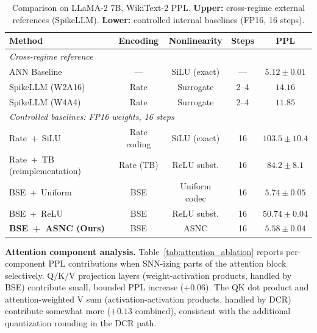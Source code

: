 \documentclass{article}
\theoremstyle{plain}
\theoremstyle{definition}
\theoremstyle{remark}
\begin{document}
\begin{table}[h!]
\centering
\caption{Comparison on LLaMA-2 7B, WikiText-2 PPL.
\textbf{Upper:} cross-regime external references (SpikeLLM).
\textbf{Lower:} controlled internal baselines (FP16, 16 steps).}
\label{tab:comparison}
\footnotesize
\setlength{\tabcolsep}{4pt}
\begin{tabular}{lcccc}
\toprule
\textbf{Method} & \textbf{Encoding} & \textbf{Nonlinearity} & \textbf{Steps} & \textbf{PPL} \\
\midrule
\multicolumn{5}{l}{\textit{Cross-regime reference}} \\
ANN Baseline              & ---          & SiLU (exact)    & ---  & $5.12 \pm 0.01$ \\
SpikeLLM (W2A16)          & Rate         & Surrogate       & 2--4 & $14.16$ \\
SpikeLLM (W4A4)           & Rate         & Surrogate       & 2--4 & $11.85$ \\
\midrule
\multicolumn{5}{l}{\textit{Controlled baselines: FP16 weights, 16 steps}} \\
Rate~+~SiLU               & Rate coding  & SiLU (exact)    & 16   & $103.5 \pm 10.4$ \\
Rate~+~TB (reimplementation)& Rate (TB)  & ReLU subst.     & 16   & $84.2 \pm 8.1$ \\
BSE~+~Uniform             & BSE          & Uniform codec   & 16   & $5.74 \pm 0.05$ \\
BSE~+~ReLU                & BSE          & ReLU subst.     & 16   & $50.74 \pm 0.04$ \\
\textbf{BSE~+~ASNC (Ours)}& BSE          & ASNC            & 16   & $\mathbf{5.58 \pm 0.04}$ \\
\bottomrule
\end{tabular}
\end{table}

\noindent\textbf{Attention component analysis.}
Table~\ref{tab:attention_ablation} reports per-component PPL contributions
when SNN-izing parts of the attention block selectively. Q/K/V projection
layers (weight-activation products, handled by BSE) contribute small, bounded
PPL increase ($+0.06$). The QK dot product and attention-weighted V sum
(activation-activation products, handled by DCR) contribute somewhat more
($+0.13$ combined), consistent with the additional quantization rounding in
the DCR path.
\end{document}
